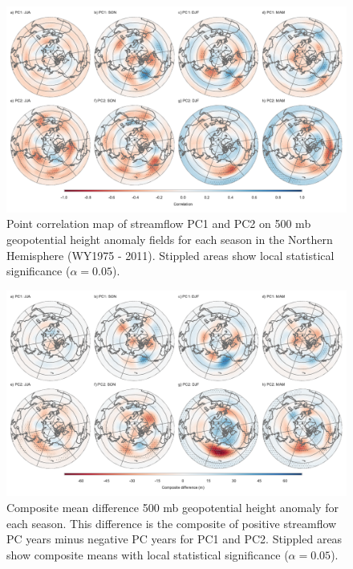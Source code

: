 \documentclass[final, double]{ua-thesis}
\begin{document}
\begin{figure}[ht]
\centering
\centerline{\includegraphics[width=190mm]{p1figures/fig2.pdf}}
\caption{Point correlation map of streamflow PC1 and PC2 on 500 mb geopotential height anomaly fields for each season in the Northern Hemisphere (WY1975 - 2011). Stippled areas show local statistical significance ($\alpha = 0.05$).}
\label{fig:corrhgt}
\end{figure}

\begin{figure}[ht]
\centering
\centerline{\includegraphics[width=190mm]{p1figures/fig3.pdf}}
\caption{Composite mean difference 500 mb geopotential height anomaly for each season. This difference is the composite of positive streamflow PC years minus negative PC years for PC1 and PC2. Stippled areas show composite means with local statistical significance ($\alpha = 0.05$).}
\label{fig:comphgt}
\end{figure}
\end{document}
